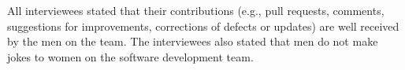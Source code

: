 \documentclass{IEEEcsmag}
\begin{document}

All interviewees stated that their contributions (e.g., pull requests, comments, suggestions for improvements, corrections of defects or updates) are well received by the men on the team. The interviewees also stated that men do not make jokes to women on the software development team. 

\end{document}
